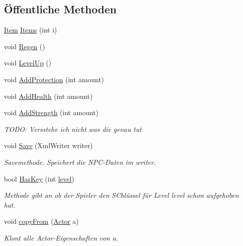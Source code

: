 \subsection*{Öffentliche Methoden}
\begin{DoxyCompactItemize}
\item 
\hyperlink{class_gruppe22_1_1_backend_1_1_item}{Item} \hyperlink{class_gruppe22_1_1_backend_1_1_actor_a5df320c3507d76483563a06002bcdc0a}{Items} (int i)
\item 
void \hyperlink{class_gruppe22_1_1_backend_1_1_actor_a01868add985a927294354d6b9a1d7004}{Regen} ()
\item 
void \hyperlink{class_gruppe22_1_1_backend_1_1_actor_aaa131c6048e5f34d460ff68888f92172}{Level\-Up} ()
\item 
void \hyperlink{class_gruppe22_1_1_backend_1_1_actor_a46b6acd21e36621b69811af94b0c85a1}{Add\-Protection} (int amount)
\item 
void \hyperlink{class_gruppe22_1_1_backend_1_1_actor_aebee25827f86035b50d452fbbc8d3f1f}{Add\-Health} (int amount)
\item 
void \hyperlink{class_gruppe22_1_1_backend_1_1_actor_a00c58df999ffc13c17fb9b2a33e0434e}{Add\-Strength} (int amount)
\begin{DoxyCompactList}\small\item\em T\-O\-D\-O\-: Versstehe ich nicht was die genau tut \end{DoxyCompactList}\item 
void \hyperlink{class_gruppe22_1_1_backend_1_1_actor_ad6372297e223c485ca0d885091edd7f4}{Save} (Xml\-Writer writer)
\begin{DoxyCompactList}\small\item\em Savemethode. Speichert die N\-P\-C-\/\-Daten im writer. \end{DoxyCompactList}\item 
bool \hyperlink{class_gruppe22_1_1_backend_1_1_actor_a48b6120de07360ef561a4d40fcbe17b6}{Has\-Key} (int \hyperlink{class_gruppe22_1_1_backend_1_1_actor_aef8ca8637a54602399de1b2d08670c9e}{level})
\begin{DoxyCompactList}\small\item\em Methode gibt an ob der Spieler den S\-Chlüssel für Level level schon aufgehoben hat. \end{DoxyCompactList}\item 
void \hyperlink{class_gruppe22_1_1_backend_1_1_actor_aec58c47e2019cfc9eeede1b0ac7ee788}{copy\-From} (\hyperlink{class_gruppe22_1_1_backend_1_1_actor}{Actor} a)
\begin{DoxyCompactList}\small\item\em Klont alle Actor-\/\-Eigenschaften von a. \end{DoxyCompactList}\item 

\end{DoxyCompactItemize}
